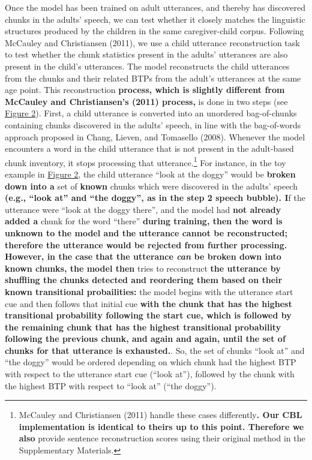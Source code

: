 \documentclass[man,mask,floatsintext]{apa6}
\let\rmarkdownfootnote\footnote%
\def\footnote{\protect\rmarkdownfootnote}
\begin{document}
Once the model has been trained on adult utterances, and thereby has
discovered chunks in the adults' speech, we can test whether it closely
matches the linguistic structures produced by the children in the same
caregiver-child corpus. Following McCauley and Christiansen (2011), we
use a child utterance reconstruction task to test whether the chunk
statistics present in the adults' utterances are also present in the
child's utterances. The model reconstructs the child utterances from the
chunks and their related BTPs from the adult's utterances at the same
age point. This reconstruction \textbf{process, which is slightly
different from McCauley and Christiansen's (2011) process,} is done in
two steps (see \protect\hyperlink{fig2}{Figure 2}). First, a child
utterance is converted into an unordered bag-of-chunks containing chunks
discovered in the adults' speech, in line with the bag-of-words approach
proposed in Chang, Lieven, and Tomasello (2008). Whenever the model
encounters a word in the child utterance that is not present in the
adult-based chunk inventory, it stops processing that
utterance.\footnote{McCauley and Christiansen (2011) handle these cases
  differently\textbf{. Our CBL implementation is identical to theirs up
  to this point. Therefore we also} provide sentence reconstruction
  scores using their original method in the Supplementary Materials.}
For instance, in the toy example in \protect\hyperlink{fig2}{Figure 2},
the child utterance \enquote{look at the doggy} would be \textbf{broken
down into a} set of \textbf{known} chunks which were discovered in the
adults' speech \textbf{(e.g., \enquote{look at} and \enquote{the doggy},
as in the step 2 speech bubble). I}f the utterance were \enquote{look at
the doggy there}, and the model had \textbf{not already added a} chunk
for the word \enquote{there} \textbf{during training, then the word is
unknown to the model and the utterance cannot be reconstructed;
therefore the utterance would be rejected from further processing.}
\textbf{However, in the case that the utterance \emph{can} be broken
down into known chunks, the model then} tries to reconstruct \textbf{the
utterance by shuffling the chunks detected and reordering them based on
their known transitional probailities:} the model begins with the
utterance start cue and then follows that initial cue \textbf{with the
chunk that has the highest transitional probability following the start
cue, which is followed by the remaining chunk that has the highest
transitional probability following the previous chunk, and again and
again, until the set of chunks for that utterance is exhausted.}. So,
the set of chunks \enquote{look at} and \enquote{the doggy} would be
ordered depending on which chunk had the highest BTP with respect to the
utterance start cue (\enquote{look at}), followed by the chunk with the
highest BTP with respect to \enquote{look at} (\enquote{the doggy}).
\end{document}
